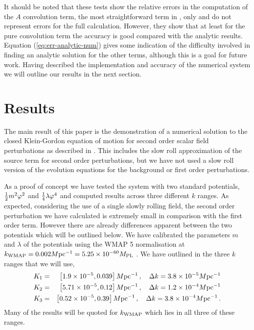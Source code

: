 It should be noted that these tests show the relative errors in the
computation of the $A$ convolution term, the most straightforward term in , only and
do not
represent
errors for the full calculation. However, they show that at least for
the pure convolution term the accuracy is good compared with the
analytic results. Equation (\ref{eq:err-analytic-num}) gives some indication of
the difficulty involved in finding an analytic solution for the other
terms, although this is a goal for future work. Having described the
implementation and accuracy of the numerical system we will outline
our results in the next section.
 
% 
% 
% 
\section{Results}
\label{sec:results}


The main result of this paper is the demonstration of a numerical solution to
the closed Klein-Gordon equation of motion for second order scalar field
perturbations as described in . This includes the slow
roll approximation of the source term for second order perturbations, but we have not used a slow
roll version of the evolution equations for the background or first order
perturbations. 

As a proof of concept we have tested the system with two standard potentials,
$\frac{1}{2} m^2 \varphi^2$ and $\frac{1}{4}\lambda\varphi^4$ and computed results across three
different $k$ ranges. As expected, considering the use of a single slowly
rolling field, the second order perturbation we have calculated is extremely
small in comparison with the first order term. However there are already
differences apparent between the two potentials which will be outlined below.
We have calibrated the parameters $m$ and $\lambda$ of the potentials using the
WMAP 5 normalisation at $k_\mathrm{WMAP}=0.002 M \mathrm{pc}^{-1} = 5.25 \times 10^{-60}M_{\mathrm{PL}}$
\cite{Komatsu:2008hk}.
We have outlined in  the three $k$ ranges that we will use,
% 
\begin{eqnarray*}
K_1 &=& \left[1.9\times 10^{-5}, 0.039\right]M \mathrm{pc}^{-1}\,,\quad \Delta k = 3.8\times 10^{-5}M \mathrm{pc}^{-1} \nonumber\\
K_2 &=& \left[5.71\times 10^{-5}, 0.12\right]M \mathrm{pc}^{-1}\,, \quad \Delta k = 1.2\times 10^{-4}M \mathrm{pc}^{-1}
\nonumber\\ 
K_3 &=& \left[0.52\times 10^{-5}, 0.39\right]M \mathrm{pc}^{-1}\,, \quad \Delta k = 3.8\times 10^{-4}M \mathrm{pc}^{-1} \,.
\end{eqnarray*}
Many of the results will be quoted for $k_\mathrm{WMAP}$ which lies in all three of these ranges.

